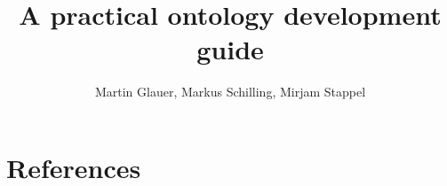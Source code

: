 \documentclass{ol-softwaremanual}
\title{A practical ontology development guide}
\author{Martin Glauer, Markus Schilling, Mirjam Stappel}
\begin{document}
\maketitle

\tableofcontents

\newpage





%
%


\section{References}


\end{document}
